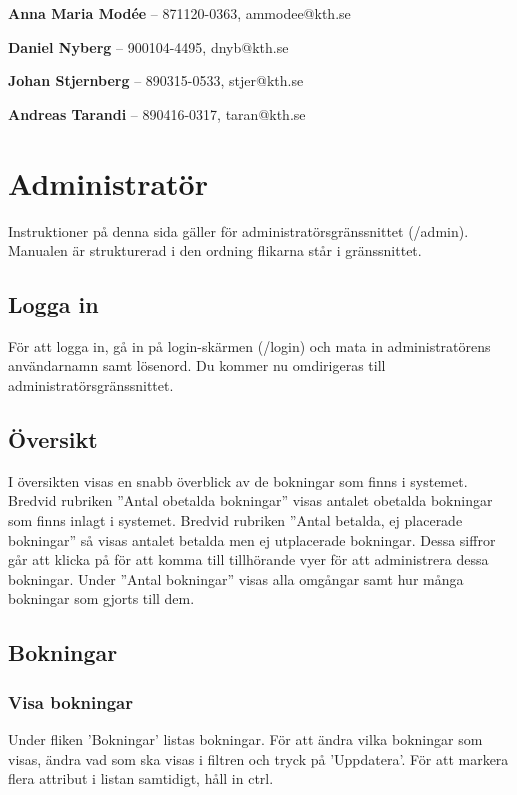 \documentclass[a4paper, twoside, 11pt, titlepage]{article}
\begin{document}
\textbf{Anna Maria Modée} -- 871120-0363, ammodee@kth.se

\textbf{Daniel Nyberg} -- 900104-4495, dnyb@kth.se

\textbf{Johan Stjernberg} -- 890315-0533, stjer@kth.se

\textbf{Andreas Tarandi} -- 890416-0317, taran@kth.se

\clearpage \tableofcontents \clearpage

\clearpage
\section{Administratör}


Instruktioner på denna sida gäller för administratörsgränssnittet (/admin). Manualen är strukturerad i den ordning flikarna står i gränssnittet.

	\subsection{Logga in}


	För att logga in, gå in på login-skärmen (/login) och mata in administratörens användarnamn samt lösenord. Du kommer nu omdirigeras till administratörsgränssnittet.

	\subsection{Översikt}


	I översikten visas en snabb överblick av de bokningar som finns i systemet. Bredvid rubriken ”Antal obetalda bokningar” visas antalet obetalda bokningar som finns inlagt i systemet. Bredvid rubriken ”Antal betalda, ej placerade bokningar” så visas antalet betalda men ej utplacerade bokningar. Dessa siffror går att klicka på för att komma till tillhörande vyer för att administrera dessa bokningar. Under ”Antal bokningar” visas alla omgångar samt hur många bokningar som gjorts till dem.

	\subsection{Bokningar}



		\subsubsection{Visa bokningar}


		Under fliken 'Bokningar' listas bokningar. För att ändra vilka bokningar som visas, ändra vad som ska visas i filtren och tryck på 'Uppdatera'. För att markera flera attribut i listan samtidigt, håll in ctrl.
\end{document}
